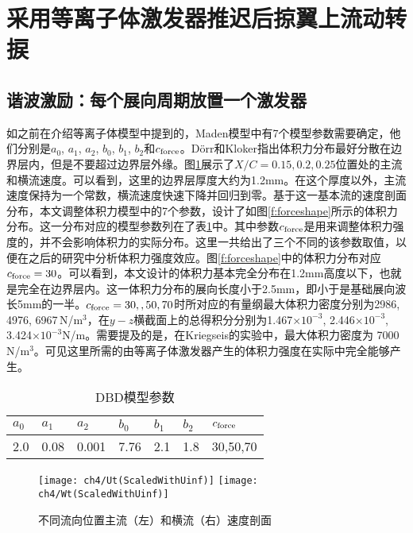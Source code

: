 \section{采用等离子体激发器推迟后掠翼上流动转捩}

\subsection{谐波激励：每个展向周期放置一个激发器}\label{subs:control1}
如之前在介绍等离子体模型中提到的，Maden模型中有7个模型参数需要确定，他们分别是$a_0$, $a_1$, $a_2$, $b_0$, $b_1$, $b_2$和$c_{\rm force}$。D\"orr和Kloker\cite{dorr2015stabilisation}指出体积力分布最好分散在边界层内，但是不要超过边界层外缘。图\ref{f:BLvelocityprofile}展示了$X/C=0.15,0.2,0.25$位置处的主流和横流速度。可以看到，这里的边界层厚度大约为1.2mm。在这个厚度以外，主流速度保持为一个常数，横流速度快速下降并回归到零。基于这一基本流的速度剖面分布，本文调整体积力模型中的7个参数，设计了如图\ref{f:forceshape}所示的体积力分布。这一分布对应的模型参数列在了表\ref{t:constantsPmodel}中。其中参数$c_{\rm force}$是用来调整体积力强度的，并不会影响体积力的实际分布。这里一共给出了三个不同的该参数取值，以便在之后的研究中分析体积力强度效应。图\ref{f:forceshape}中的体积力分布对应$c_{\rm force}=30$。可以看到，本文设计的体积力基本完全分布在1.2mm高度以下，也就是完全在边界层内。这一体积力分布的展向长度小于2.5mm，即小于是基础展向波长5mm的一半。$c_{\rm force}=30,, 50, 70$时所对应的有量纲最大体积力密度分别为2986, 4976, 6967\,N/m$^3$，在$y-z$横截面上的总得积分分别为1.467$\times 10^{-3}$, 2.446$\times 10^{-3}$, 3.424$\times 10^{-3}$N/m。需要提及的是，在Kriegseis的实验中\cite{kriegseis2013velocity}，最大体积力密度为 7000\,N/m$^3$。可见这里所需的由等离子体激发器产生的体积力强度在实际中完全能够产生。
\begin{table}[htb]
\caption{DBD模型参数}\label{t:constantsPmodel}
    \begin{center}
    \begin{tabular}{p{1.5cm}p{1.5cm}p{1.5cm}p{1.5cm}p{1.5cm}p{1.5cm}p{2cm}}
      \toprule[1.5pt]
      $a_0$ & $a_1$ & $a_2$ & $b_0$ & $b_1$ & $b_2$ & $c_{\rm force}$ \\\midrule[1pt]
      2.0 & 0.08 & 0.001 & 7.76 & 2.1 & 1.8 & 30,50,70 \\
      \bottomrule[1.5pt]
    \end{tabular}
    \end{center}
\end{table}
\begin{figure}[htb]
\centering
  \texttt{[image: ch4/Ut(ScaledWithUinf)]} \texttt{[image: ch4/Wt(ScaledWithUinf)]}
  \caption{不同流向位置主流（左）和横流（右）速度剖面}%
  \label{f:BLvelocityprofile}
\end{figure}

